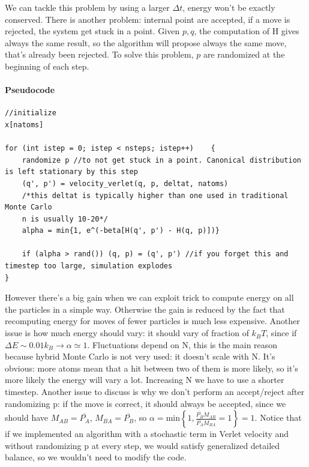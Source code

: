 \documentclass[a4paper, italian, openany]{book}
\begin{document}
We can tackle this problem by using a larger $\Delta t$, energy won't be exactly conserved. There is another problem: internal point are accepted, if a move is rejected, the system get stuck in a point. Given $p,q$, the computation of H gives always the same result, so the algorithm will propose always the same move, that's already been rejected. To solve this problem, $p$ are randomized at the beginning of each step.

\paragraph{Pseudocode}

\begin{lstlisting}
//initialize
x[natoms]

for (int istep = 0; istep < nsteps; istep++)	{
	randomize p //to not get stuck in a point. Canonical distribution is left stationary by this step
	(q', p') = velocity_verlet(q, p, deltat, natoms)
	/*this deltat is typically higher than one used in traditional Monte Carlo
	n is usually 10-20*/
	alpha = min{1, e^(-beta[H(q', p') - H(q, p)])}
	
	if (alpha > rand())	(q, p) = (q', p') //if you forget this and timestep too large, simulation explodes
}
\end{lstlisting}

However there's a big gain when we can exploit trick to compute energy on all the particles in a simple way. Otherwise the gain is reduced by the fact that recomputing energy for moves of fewer particles is much less expensive.\newline
Another issue is how much energy should vary: it should vary of fraction of $k_B T$, since if $\Delta E \sim 0.01 k_B \rightarrow \alpha \simeq 1$. Fluctuations depend on N, this is the main reason because hybrid Monte Carlo is not very used: it doesn't scale with N. 
It's obvious: more atoms mean that a hit between two of them is more likely, so it's more likely the energy will vary a lot. Increasing N we have to use a shorter timestep.\newline
Another issue to discuss is why we don't perform an accept/reject after randomizing p: if the move is correct, it should always be accepted, since we should have $M_{AB} = \bar{P_A}$, $M_{BA} = \bar{P_B}$, so $\alpha = \mbox{min}\left \{ 1, \frac{\bar{P_B}M_{AB}}{\bar{P_A}M_{BA}}=1 \right \} = 1$.\newline
Notice that if we implemented an algorithm with a stochastic term in Verlet velocity and without randomizing p at every step, we would satisfy generalized detailed balance, so we wouldn't need to modify the code.
\end{document}
